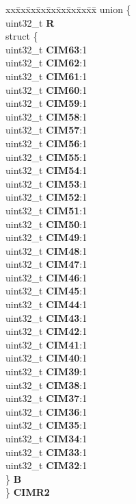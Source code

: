 \begin{DoxyCompactItemize}
\begin{tabbing}
\end{tabbing}\item 
\mbox{\label{structADC__tag_a301bf6d2272808835fbee83b6f41a304}} 
\begin{tabbing}
xx\=xx\=xx\=xx\=xx\=xx\=xx\=xx\=xx\=\kill
union \{\\
\>uint32\_t {\bfseries R}\\
\>struct \{\\
\>\>uint32\_t {\bfseries CIM63}:1\\
\>\>uint32\_t {\bfseries CIM62}:1\\
\>\>uint32\_t {\bfseries CIM61}:1\\
\>\>uint32\_t {\bfseries CIM60}:1\\
\>\>uint32\_t {\bfseries CIM59}:1\\
\>\>uint32\_t {\bfseries CIM58}:1\\
\>\>uint32\_t {\bfseries CIM57}:1\\
\>\>uint32\_t {\bfseries CIM56}:1\\
\>\>uint32\_t {\bfseries CIM55}:1\\
\>\>uint32\_t {\bfseries CIM54}:1\\
\>\>uint32\_t {\bfseries CIM53}:1\\
\>\>uint32\_t {\bfseries CIM52}:1\\
\>\>uint32\_t {\bfseries CIM51}:1\\
\>\>uint32\_t {\bfseries CIM50}:1\\
\>\>uint32\_t {\bfseries CIM49}:1\\
\>\>uint32\_t {\bfseries CIM48}:1\\
\>\>uint32\_t {\bfseries CIM47}:1\\
\>\>uint32\_t {\bfseries CIM46}:1\\
\>\>uint32\_t {\bfseries CIM45}:1\\
\>\>uint32\_t {\bfseries CIM44}:1\\
\>\>uint32\_t {\bfseries CIM43}:1\\
\>\>uint32\_t {\bfseries CIM42}:1\\
\>\>uint32\_t {\bfseries CIM41}:1\\
\>\>uint32\_t {\bfseries CIM40}:1\\
\>\>uint32\_t {\bfseries CIM39}:1\\
\>\>uint32\_t {\bfseries CIM38}:1\\
\>\>uint32\_t {\bfseries CIM37}:1\\
\>\>uint32\_t {\bfseries CIM36}:1\\
\>\>uint32\_t {\bfseries CIM35}:1\\
\>\>uint32\_t {\bfseries CIM34}:1\\
\>\>uint32\_t {\bfseries CIM33}:1\\
\>\>uint32\_t {\bfseries CIM32}:1\\
\>\} {\bfseries B}\\
\} {\bfseries CIMR2}\\


\end{tabbing}
\end{DoxyCompactItemize}
